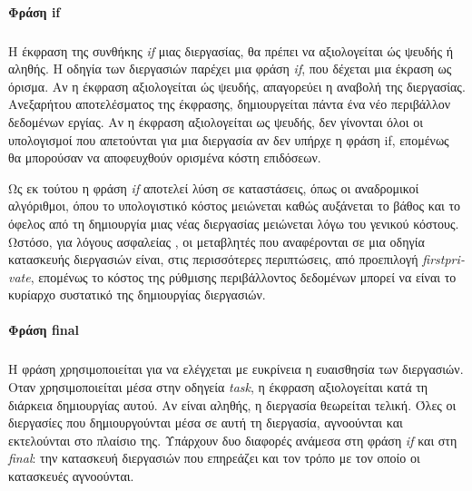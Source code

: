 \documentclass[12pt]{article}
\newcommand{\en}[1]{\foreignlanguage{english}{#1}}
\begin{document}
\paragraph{Φράση \en{if}}
\subparagraph{}
Η έκφραση της συνθήκης \emph{\en{if}} μιας διεργασίας, θα πρέπει να αξιολογείται ώς ψευδής ή αληθής. 
Η οδηγία των διεργασιών παρέχει μια φράση \emph{\en{if}}, που δέχεται μια έκραση ως όρισμα. Αν η έκφραση αξιολογείται ώς ψευδής, απαγορεύει η αναβολή της διεργασίας.
Ανεξαρήτου αποτελέσματος της έκφρασης, δημιουργείται πάντα ένα νέο περιβάλλον δεδομένων εργίας. Αν η έκφραση αξιολογείται ως ψευδής, δεν γίνονται όλοι οι υπολογισμοί που απετούνται για μια διεργασία αν δεν υπήρχε η φράση if, επομένως θα μπορούσαν να αποφευχθούν ορισμένα κόστη επιδόσεων.

Ως εκ τούτου η φράση \emph{\en{if}} αποτελεί λύση σε καταστάσεις, όπως οι αναδρομικοί αλγόριθμοι, όπου
το υπολογιστικό κόστος μειώνεται καθώς αυξάνεται το βάθος και το όφελος από τη δημιουργία μιας νέας διεργασίας
μειώνεται λόγω του γενικού κόστους.
Ωστόσο, για λόγους ασφαλείας \cite{parallel_dist}, οι μεταβλητές που αναφέρονται σε μια οδηγία κατασκευής διεργασιών είναι, στις περισσότερες περιπτώσεις, από προεπιλογή \emph{\en{firstprivate}}, επομένως το κόστος
της ρύθμισης περιβάλλοντος δεδομένων μπορεί να είναι το κυρίαρχο συστατικό της δημιουργίας διεργασιών.

\paragraph{Φράση \en{final}}
\subparagraph{}
Η φράση χρησιμοποιείται για να ελέγχεται με ευκρίνεια η ευαισθησία των διεργασιών. Οταν χρησιμοποιείται μέσα στην οδηγεία \emph{\en{task}}, η έκφραση αξιολογείται κατά τη διάρκεια δημιουργίας αυτού.  Αν είναι αληθής, η διεργασία θεωρείται τελική. Όλες οι διεργασίες που δημιουργούνται μέσα σε αυτή τη διεργασία, αγνοούνται και εκτελούνται στο πλαίσιο της.
\clearpage
Υπάρχουν δυο διαφορές ανάμεσα στη φράση \emph{\en{if}} και στη \emph{\en{final}}: την κατασκευή διεργασιών που επηρεάζει και τον τρόπο με τον οποίο οι κατασκευές αγνοούνται\cite{tasking1}.
\end{document}
